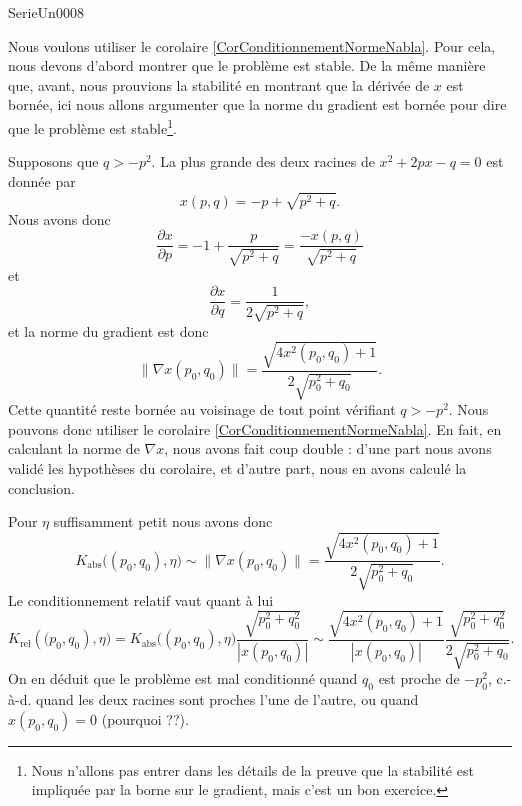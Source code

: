 
\begin{corrige}{SerieUn0008}

	Nous voulons utiliser le corolaire \ref{CorConditionnementNormeNabla}. Pour cela, nous devons d'abord montrer que le problème est stable. De la même manière que, avant, nous prouvions la stabilité en montrant que la dérivée de $x$ est bornée, ici nous allons argumenter que la norme du gradient est bornée pour dire que le problème est stable\footnote{Nous n'allons pas entrer dans les détails de la preuve que la stabilité est impliquée par la borne sur le gradient, mais c'est un bon exercice.}.

	Supposons que $q > -p^2$. La plus grande des deux racines de $x^2 + 2px - q = 0$ est donnée par
	\begin{equation}
		x(p,q) = -p + \sqrt{p^2+q}.
	\end{equation}
	Nous avons donc
	\begin{equation}
		\frac{\partial x}{\partial p} = -1 + \frac{p}{\sqrt{p^2+q}} = \frac{-x(p,q)}{\sqrt{p^2+q}}
	\end{equation}
	et
	\begin{equation}
		\frac{\partial x}{\partial q} = \frac{1}{2\sqrt{p^2+q}},
	\end{equation}
	et la norme du gradient est donc
	\begin{equation}
		\| \nabla x(p_0,q_0) \| = \frac{\sqrt{4 x^2(p_0,q_0)+1}}{2\sqrt{p_0^2+q_0}}.
	\end{equation}
	Cette quantité reste bornée au voisinage de tout point vérifiant $q>-p^2$. Nous pouvons donc utiliser le corolaire \ref{CorConditionnementNormeNabla}. En fait, en calculant la norme de $\nabla x$, nous avons fait coup double : d'une part nous avons validé les hypothèses du corolaire, et d'autre part, nous en avons calculé la conclusion.

	Pour $\eta$ suffisamment petit nous avons donc
	\begin{equation}
		K_{\text{abs}}\big((p_0,q_0),\eta\big) \sim \| \nabla x(p_0,q_0) \| = \frac{\sqrt{4 x^2(p_0,q_0)+1}}{2\sqrt{p_0^2+q_0}}.
	\end{equation}
	Le conditionnement relatif vaut quant à lui
	\begin{equation}
		K_{\text{rel}}(\big(p_0,q_0),\eta\big) = K_{\text{abs}}\big((p_0,q_0),\eta\big) \frac{\sqrt{p_0^2+q_0^2}}{|x(p_0,q_0)|} \sim \frac{\sqrt{4 x^2(p_0,q_0)+1}}{|x(p_0,q_0)|}\frac{\sqrt{p_0^2+q_0^2}}{2\sqrt{p_0^2+q_0}}.
	\end{equation}
	On en déduit que le problème est mal conditionné quand $q_0$ est proche de $-p_0^2$, c.-à-d. quand les deux racines sont proches l'une de l'autre, ou quand $x(p_0,q_0) = 0$ (pourquoi ??).

\end{corrige}

